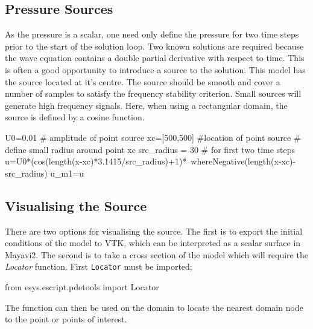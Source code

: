 \subsection{Pressure Sources}
As the pressure is a scalar, one need only define the pressure for two 
time steps prior to the start of the solution loop. Two known solutions are
required because the wave equation contains a double partial derivative with
respect to time. This is often a good opportunity to introduce a source to the
solution. This model has the source located at it's centre. The source should
be smooth and cover a number of samples to satisfy the frequency stability
criterion. Small sources will generate high frequency signals. Here, when using
a rectangular domain, the source is defined by a cosine function.
\begin{python}
U0=0.01 # amplitude of point source
xc=[500,500] #location of point source
# define small radius around point xc
src_radius = 30
# for first two time steps
u=U0*(cos(length(x-xc)*3.1415/src_radius)+1)*\
	whereNegative(length(x-xc)-src_radius)
u_m1=u
\end{python}

\subsection{Visualising the Source}
There are two options for visualising the source. The first is to export the
initial conditions of the model to VTK, which can be interpreted as a scalar
surface in Mayavi2. The second is to take a cross section of the model which
will require the \textit{Locator} function. 
First \verb!Locator! must be imported;
\begin{python}
 from esys.escript.pdetools import Locator
\end{python}
The function can then be used on the domain to locate the nearest domain node
to the point or points of interest.

